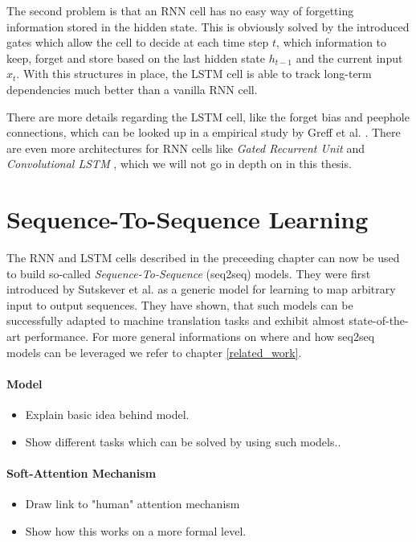 The second problem is that an RNN cell has no easy way of forgetting information stored in the hidden state. This is obviously solved by the introduced gates which allow the cell to decide at each time step $t$, which information to keep, forget and store based on the last hidden state $h_{t-1}$ and the current input $x_t$. With this structures in place, the LSTM cell is able to track long-term dependencies much better than a vanilla RNN cell.

There are more details regarding the LSTM cell, like the forget bias and peephole connections, which can be looked up in a empirical study by Greff et al. \cite{Greff:2016}. There are even more architectures for RNN cells like \emph{Gated Recurrent Unit} \cite{Chung:2014} and \emph{Convolutional LSTM} \cite{Xingjian:2015}, which we will not go in depth on in this thesis.

\section{Sequence-To-Sequence Learning}
The RNN and LSTM cells described in the preceeding chapter can now be used to build so-called \emph{Sequence-To-Sequence} (seq2seq) models. They were first introduced by Sutskever et al. \cite{Sutskever:2014} as a generic model for learning to map arbitrary input to output sequences. They have shown, that such models can be successfully adapted to machine translation tasks and exhibit almost state-of-the-art performance. For more general informations on where and how seq2seq models can be leveraged we refer to chapter \ref{related_work}.

\paragraph{Model}
\begin{itemize}
	\item Explain basic idea behind model.
	\item Show different tasks which can be solved by using such models..
\end{itemize}

\paragraph{Soft-Attention Mechanism}
\begin{itemize}
\item Draw link to "human" attention mechanism
\item Show how this works on a more formal level.
\end{itemize}

